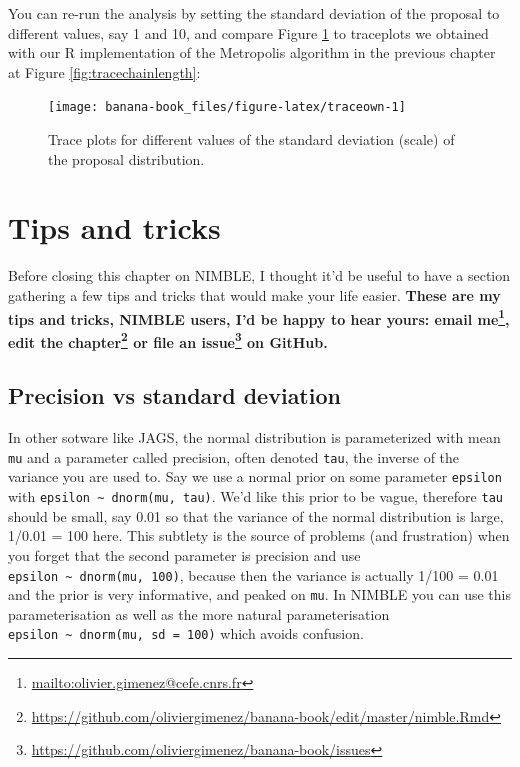 \documentclass[
  12pt,
]{krantz}
\renewcommand{\href}[2]{#2\footnote{\url{#1}}}
\begin{document}
You can re-run the analysis by setting the standard deviation of the proposal to different values, say 1 and 10, and compare Figure \ref{fig:traceown} to traceplots we obtained with our R implementation of the Metropolis algorithm in the previous chapter at Figure \ref{fig:tracechainlength}:

\begin{figure}

{\centering \texttt{[image: banana-book\_files/figure-latex/traceown-1]} 

}

\caption{Trace plots for different values of the standard deviation (scale) of the proposal distribution.}\label{fig:traceown}
\end{figure}

\hypertarget{tips-and-tricks}{%
\section{Tips and tricks}\label{tips-and-tricks}}

Before closing this chapter on NIMBLE, I thought it'd be useful to have a section gathering a few tips and tricks that would make your life easier. \textbf{These are my tips and tricks, NIMBLE users, I'd be happy to hear yours: \href{mailto:olivier.gimenez@cefe.cnrs.fr}{email me}, \href{https://github.com/oliviergimenez/banana-book/edit/master/nimble.Rmd}{edit the chapter} or \href{https://github.com/oliviergimenez/banana-book/issues}{file an issue} on GitHub.}

\hypertarget{precision-vs-standard-deviation}{%
\subsection{Precision vs standard deviation}\label{precision-vs-standard-deviation}}

In other sotware like JAGS, the normal distribution is parameterized with mean \texttt{mu} and a parameter called precision, often denoted \texttt{tau}, the inverse of the variance you are used to. Say we use a normal prior on some parameter \texttt{epsilon} with \texttt{epsilon\ \textasciitilde{}\ dnorm(mu,\ tau)}. We'd like this prior to be vague, therefore \texttt{tau} should be small, say 0.01 so that the variance of the normal distribution is large, 1/0.01 = 100 here. This subtlety is the source of problems (and frustration) when you forget that the second parameter is precision and use \texttt{epsilon\ \textasciitilde{}\ dnorm(mu,\ 100)}, because then the variance is actually 1/100 = 0.01 and the prior is very informative, and peaked on \texttt{mu}. In NIMBLE you can use this parameterisation as well as the more natural parameterisation \texttt{epsilon\ \textasciitilde{}\ dnorm(mu,\ sd\ =\ 100)} which avoids confusion.
\end{document}
